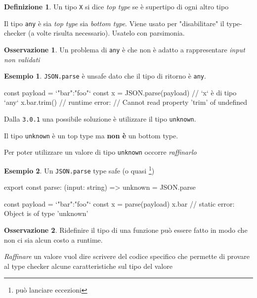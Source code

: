 \documentclass[12pt]{article}
\theoremstyle{definition}
\newtheorem{definition}{Definizione}[section]
\newtheorem{example}{Esempio}[subsection]
\newtheorem{observation}{Osservazione}[subsection]
\newenvironment{code}
  {\vspace{0.5cm} \VerbatimEnvironment\begin{typescriptcode}}
  {\end{typescriptcode} \vspace{0.2cm}}
\begin{document}
\begin{definition}
Un tipo \texttt{X} si dice \emph{top type} se è supertipo di ogni altro tipo
\end{definition}

Il tipo \texttt{any} è sia \emph{top type} sia \emph{bottom type}.
Viene usato per "disabilitare" il type-checker (a volte risulta necessario).
Usatelo con parsimonia.

\begin{observation}
Un problema di \texttt{any} è che non è adatto a rappresentare \emph{input non validati}
\end{observation}

\begin{example}
\texttt{JSON.parse} è unsafe dato che il tipo di ritorno è \texttt{any}.

\begin{code}
const payload = `{"bar":"foo"}`
const x = JSON.parse(payload)
// `x` è di tipo `any`
x.bar.trim() // runtime error:
// Cannot read property 'trim' of undefined
\end{code}
\end{example}

Dalla \texttt{3.0.1} una possibile soluzione è utilizzare il tipo \texttt{unknown}.

Il tipo \texttt{unknown} è un top type ma \textbf{non è} un bottom type.

Per poter utilizzare un valore di tipo \texttt{unknown} occorre \emph{raffinarlo}

\begin{example}
Un \texttt{JSON.parse} type safe (o quasi \footnote{può lanciare eccezioni})

\begin{code}
export const parse: (input: string) => unknown = JSON.parse

const payload = `{"bar":"foo"}`
const x = parse(payload)
x.bar // static error: Object is of type 'unknown'
\end{code}
\end{example}

\begin{observation}
Ridefinire il tipo di una funzione può essere fatto in modo che non ci sia alcun costo a runtime.
\end{observation}

\emph{Raffinare} un valore vuol dire scrivere del codice specifico che permette di provare al type checker
alcune caratteristiche sul tipo del valore
\end{document}
